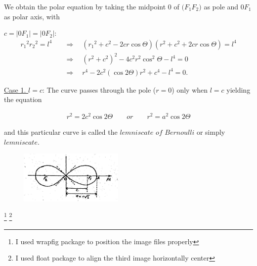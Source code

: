 \documentclass[11pt]{amsbook}
\begin{document}
We obtain the polar equation by taking the midpoint 0 of $ \big( F_{1}F_{2} \big) $ as pole and $0F_{1}$ as polar axis, with\par
$c = |0F_{1}|=|0F_{2}|:$
\begin{align}
	\label{eq:b1p2_318_firstEquation}
	{r_{1}}^{2}
	{r_{2}}^{2} 
	= l^{4} \quad 
	&\Rightarrow \quad ({r_{1}}^{2} 
		+ c^{2} 
		- 2cr \cos{\Theta})(r^{2} 
		+ c^{2} 
		+ 2cr \cos{\Theta}) 
		= l^{4}\nonumber \\
	& \Rightarrow \quad (r^{2} 
		+ c^{2})^{2} 
		- 4c^{2}r^{2} {\cos^{2}{\Theta}} 
		- l^{4} 
		= 0 \nonumber \\
	& \Rightarrow \quad r^{4} 
		- 2c^{2}(\cos{2\Theta})r^{2} 
		+ c^{4} 
		- l^{4} 
		= 0.
\end{align}

\underline{Case 1. $ l=c$}: The curve passes through the pole ($r=0$) only when $l=c$ yielding the equation

\begin{align}
	\label{eq:b1p2_318_secondEquation}
	r^{2} 
	=  2c^{2} \cos{2\Theta} 
	\quad \quad or \quad \quad 
	 r^{2} 
	= a^{2} \cos{2\Theta}
\end{align}

and this particular curve is called the $lemniscate$ $of$ $Bernoulli$ or simply $lemniscate$.

\begin{figure}[H]
	\centering
	\includegraphics[width=0.45\textwidth]{images/b1p2-318-fig03}
\end{figure}


\footnote{I used wrapfig package to position the image files properly}
\footnote{I used float package to align the third image horizontally center}
\end{document}
